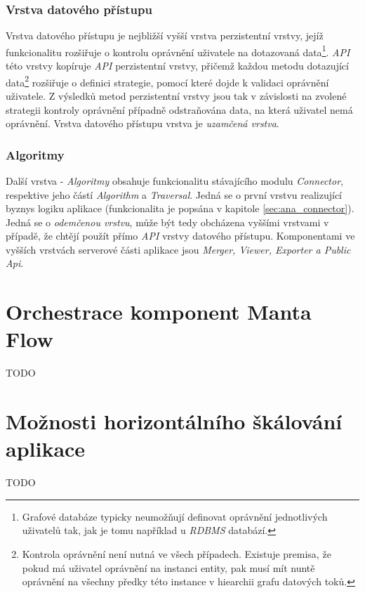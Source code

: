 \subsubsection{Vrstva datového přístupu}
\label{sec:des_data_access}
Vrstva datového přístupu je nejbližší vyšší vrstva perzistentní vrstvy, jejíž funkcionalitu rozšiřuje o kontrolu oprávnění uživatele na dotazovaná data\footnote{Grafové databáze typicky neumožňují definovat oprávnění jednotlivých uživatelů tak, jak je tomu například u \textit{RDBMS} databází.}. \textit{API} této vrstvy kopíruje \textit{API} perzistentní vrstvy, přičemž každou metodu dotazující data\footnote{Kontrola oprávnění není nutná ve všech případech. Existuje premisa, že pokud má uživatel oprávnění na instanci entity, pak musí mít nuntě oprávnění na všechny předky této instance v hiearchii grafu datových toků.} rozšiřuje o definici strategie, pomocí které dojde k validaci oprávnění uživatele. Z výsledků metod perzistentní vrstvy jsou tak v závislosti na zvolené strategii kontroly oprávnění případně odstraňována data, na která uživatel nemá oprávnění. Vrstva datového přístupu vrstva je \textit{uzamčená vrstva}.

\subsubsection{Algoritmy}
Další vrstva - \textit{Algoritmy} obsahuje funkcionalitu stávajícího modulu \textit{Connector}, respektive jeho částí \textit{Algorithm} a \textit{Traversal}. Jedná se o první vrstvu realizující byznys logiku aplikace (funkcionalita je popsána v kapitole \ref{sec:ana_connector}). Jedná se o \textit{odemčenou vrstvu}, může být tedy obcházena vyššími vrstvami v případě, že chtějí použít přímo \textit{API} vrstvy datového přístupu. Komponentami ve vyšších vrstvách serverové části aplikace jsou \textit{Merger, Viewer, Exporter a Public Api}.


\section{Orchestrace komponent Manta Flow}
\label{sec:des_architecture}
TODO

\section{Možnosti horizontálního škálování aplikace}
\label{sec:des_scaling}
TODO



